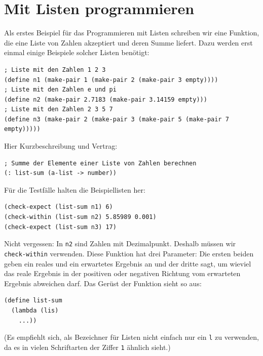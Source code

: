 \section{Mit Listen programmieren}

Als erstes Beispiel für das Programmieren mit Listen schreiben wir
eine Funktion, die eine Liste von Zahlen akzeptiert und deren Summe
liefert.  Dazu werden erst einmal einige Beispiele solcher Listen
benötigt:
%
\begin{verbatim}
; Liste mit den Zahlen 1 2 3
(define n1 (make-pair 1 (make-pair 2 (make-pair 3 empty))))
; Liste mit den Zahlen e und pi
(define n2 (make-pair 2.7183 (make-pair 3.14159 empty)))
; Liste mit den Zahlen 2 3 5 7
(define n3 (make-pair 2 (make-pair 3 (make-pair 5 (make-pair 7 empty)))))
\end{verbatim}

Hier Kurzbeschreibung und Vertrag:\label{sec:list-sum}
%
\begin{verbatim}
; Summe der Elemente einer Liste von Zahlen berechnen
(: list-sum (a-list -> number))
\end{verbatim}
%
Für die Testfälle halten die Beispiellisten her:
%
\begin{verbatim}
(check-expect (list-sum n1) 6)
(check-within (list-sum n2) 5.85989 0.001)
(check-expect (list-sum n3) 17)
\end{verbatim}
%
Nicht vergessen: In \texttt{n2} sind Zahlen mit Dezimalpunkt.
Deshalb müssen wir \texttt{check-within} verwenden.  Diese Funktion
hat drei Parameter: Die ersten beiden geben ein reales und ein
erwartetes Ergebnis an
und der dritte sagt, um wieviel das reale Ergebnis in der positiven
oder negativen Richtung vom erwarteten Ergebnis abweichen darf. Das Gerüst der
Funktion sieht so aus:
%
\begin{verbatim}
(define list-sum
  (lambda (lis)
    ...))
\end{verbatim}
%
(Es empfiehlt sich, als Bezeichner für Listen nicht einfach nur ein
\texttt{l} zu verwenden, da es in vielen Schriftarten der Ziffer
\texttt{1} ähnlich sieht.)

